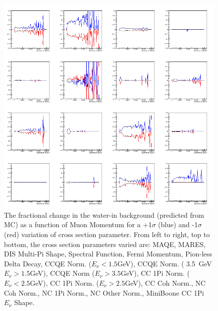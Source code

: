 \begin{figure}[H]
\centering
\includegraphics[width=5in]{Figures/TN100Plots/c_13_0.png}
\caption{The fractional change in the water-in background (predicted from MC) as a function of Muon Momentum for a +1$\sigma$ (blue) and -1$\sigma$ (red) variation of cross section parameter. From left to right, top to bottom, the cross section parameters varied are: MAQE, MARES, DIS Multi-Pi Shape, Spectral Function, Fermi Momentum, Pion-less Delta Decay, CCQE Norm. ($E_\nu < 1.5$GeV), CCQE Norm. ( 3.5~GeV$E_\nu>1.5$GeV), CCQE Norm ($E_\nu > 3.5$GeV), CC 1Pi Norm. ($E_\nu < 2.5$GeV), CC 1Pi Norm. ($E_\nu > 2.5$GeV), CC Coh Norm., NC Coh Norm., NC 1Pi Norm., NC Other Norm., MiniBoone CC 1Pi $E_\nu$ Shape.}
\label{fig:xsvarPwB}
\end{figure}

